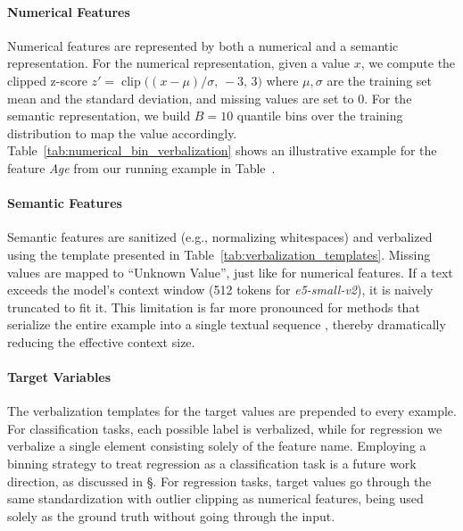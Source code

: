\paragraph{Numerical Features}  
Numerical features are represented by both a numerical and a semantic representation. For the numerical representation, given a value $x$, we compute the clipped z-score $z' = \operatorname{clip}\bigl((x - \mu)/\sigma,\,-3,\,3\bigr)$ where $\mu,\sigma$ are the training set mean and the standard deviation, and missing values are set to 0. For the semantic representation, we build $B=10$ quantile bins over the training distribution to map the value accordingly. Table~\ref{tab:numerical_bin_verbalization} shows an illustrative example for the feature \textit{Age} from our running example in Table~. 



\paragraph{Semantic Features}\label{app:arch:verbalize_semantic}  
Semantic features are sanitized (e.g., normalizing whitespaces) and verbalized using the template presented in Table~\ref{tab:verbalization_templates}. Missing values are mapped to ``Unknown Value'', just like for numerical features. If a text exceeds the model's context window (512 tokens for \textit{e5-small-v2}), it is naively truncated to fit it. This limitation is far more pronounced for methods that serialize the entire example into a single textual sequence \cite{yan_making_2023}, thereby dramatically reducing the effective context size.


\paragraph{Target Variables} The verbalization templates for the target values are prepended to every example. For classification tasks, each possible label is verbalized, while for regression we verbalize a single element consisting solely of the feature name. Employing a binning strategy to treat regression as a classification task is a future work direction, as discussed in \S{}. For regression tasks, target values go through the same standardization with outlier clipping as numerical features, being used solely as the ground truth without going through the input. 


